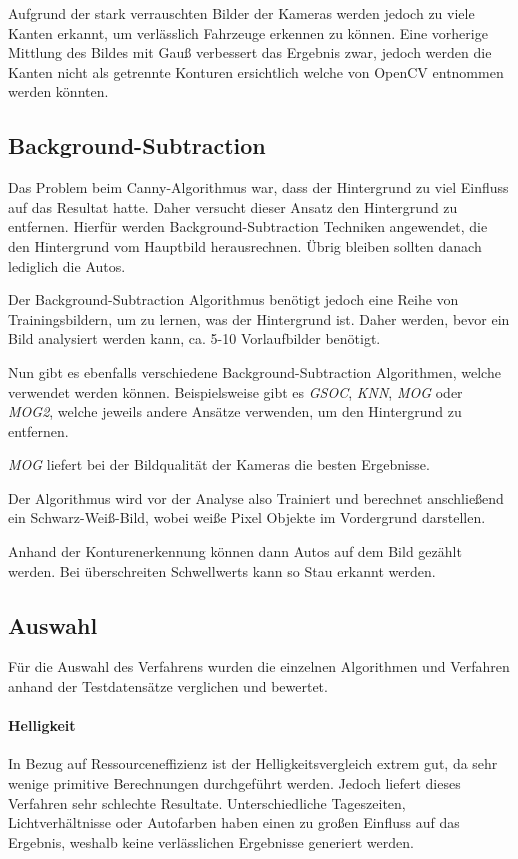 Aufgrund der stark verrauschten Bilder der Kameras werden jedoch zu viele Kanten erkannt, um verlässlich Fahrzeuge erkennen zu können.
Eine vorherige Mittlung des Bildes mit Gauß verbessert das Ergebnis zwar, jedoch werden die Kanten nicht als getrennte Konturen ersichtlich welche von OpenCV entnommen werden könnten.
	
\subsection{Background-Subtraction}
Das Problem beim Canny-Algorithmus war, dass der Hintergrund zu viel Einfluss auf das Resultat hatte.
Daher versucht dieser Ansatz den Hintergrund zu entfernen. Hierfür werden Background-Subtraction Techniken angewendet, die den Hintergrund
vom Hauptbild herausrechnen. Übrig bleiben sollten danach lediglich die Autos.

Der Background-Subtraction Algorithmus benötigt jedoch eine Reihe von Trainingsbildern, um zu lernen, was der Hintergrund ist.
Daher werden, bevor ein Bild analysiert werden kann, ca. 5-10 Vorlaufbilder benötigt.

Nun gibt es ebenfalls verschiedene Background-Subtraction Algorithmen, welche verwendet werden können. Beispielsweise gibt es {\em GSOC}, {\em KNN}, {\em MOG} oder {\em MOG2}, welche jeweils andere Ansätze verwenden, um den Hintergrund zu entfernen.

{\em MOG} liefert bei der Bildqualität der Kameras die besten Ergebnisse.

Der Algorithmus wird vor der Analyse also Trainiert und berechnet anschließend ein Schwarz-Weiß-Bild, wobei weiße Pixel Objekte im Vordergrund darstellen.

Anhand der Konturenerkennung können dann Autos auf dem Bild gezählt werden. Bei überschreiten Schwellwerts kann so Stau erkannt werden.

\subsection{Auswahl}
Für die Auswahl des Verfahrens wurden die einzelnen Algorithmen und Verfahren anhand der Testdatensätze verglichen und bewertet.

\paragraph{Helligkeit}
In Bezug auf Ressourceneffizienz ist der Helligkeitsvergleich extrem gut, da sehr wenige primitive Berechnungen durchgeführt werden.
Jedoch liefert dieses Verfahren sehr schlechte Resultate. Unterschiedliche Tageszeiten, Lichtverhältnisse oder Autofarben haben einen zu großen Einfluss auf das Ergebnis, weshalb keine verlässlichen Ergebnisse generiert werden.

